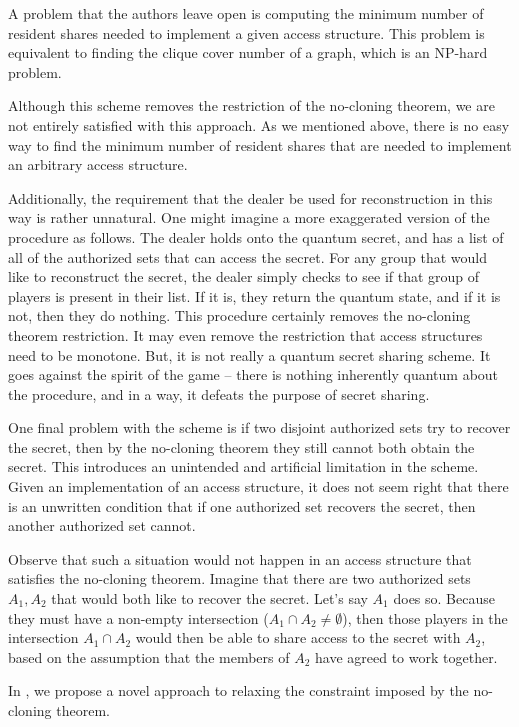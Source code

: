 A problem that the authors leave open is computing the minimum number of resident shares needed to implement a given access structure. This problem is equivalent to finding the clique cover number of a graph, which is an NP-hard problem.

Although this scheme removes the restriction of the no-cloning theorem, we are not entirely satisfied with this approach. As we mentioned above, there is no easy way to find the minimum number of resident shares that are needed to implement an arbitrary access structure.

Additionally, the requirement that the dealer be used for reconstruction in this way is rather unnatural. One might imagine a more exaggerated version of the procedure as follows. The dealer holds onto the quantum secret, and has a list of all of the authorized sets that can access the secret. For any group that would like to reconstruct the secret, the dealer simply checks to see if that group of players is present in their list. If it is, they return the quantum state, and if it is not, then they do nothing. This procedure certainly removes the no-cloning theorem restriction. It may even remove the restriction that access structures need to be monotone. But, it is not really a quantum secret sharing scheme. It goes against the spirit of the game -- there is nothing inherently quantum about the procedure, and in a way, it defeats the purpose of secret sharing.

One final problem with the scheme is if two disjoint authorized sets try to recover the secret, then by the no-cloning theorem they still cannot both obtain the secret. This introduces an unintended and artificial limitation in the scheme. Given an implementation of an access structure, it does not seem right that there is an unwritten condition that if one authorized set recovers the secret, then another authorized set cannot. 

Observe that such a situation would not happen in an access structure that satisfies the no-cloning theorem. Imagine that there are two authorized sets $A_1,A_2$ that would both like to recover the secret. Let's say $A_1$ does so. Because they must have a non-empty intersection ($A_1 \cap A_2 \neq \emptyset$), then those players in the intersection $A_1 \cap A_2$ would then be able to share access to the secret with $A_2$, based on the assumption that the members of $A_2$ have agreed to work together.

In , we propose a novel approach to relaxing the constraint imposed by the no-cloning theorem.
